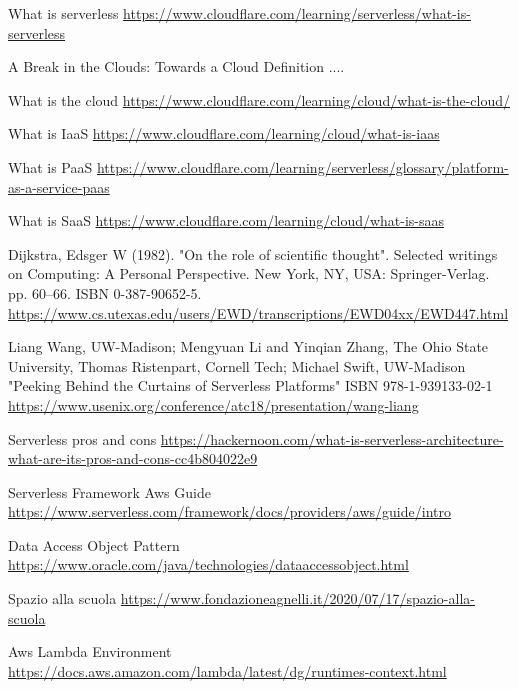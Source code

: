 \begin{thebibliography}{9}

     What is serverless
    \url{https://www.cloudflare.com/learning/serverless/what-is-serverless}

     A Break in the Clouds: Towards a Cloud
    Deﬁnition ....

     What is the cloud
    \url{https://www.cloudflare.com/learning/cloud/what-is-the-cloud/}

     What is IaaS
    \url{https://www.cloudflare.com/learning/cloud/what-is-iaas}

     What is PaaS
    \url{https://www.cloudflare.com/learning/serverless/glossary/platform-as-a-service-paas}

     What is SaaS
    \url{https://www.cloudflare.com/learning/cloud/what-is-saas}

      Dijkstra, Edsger W (1982).
    "On the role of scientific thought". Selected writings on Computing: A Personal
    Perspective. New York, NY, USA: Springer-Verlag. pp. 60–66. ISBN 0-387-90652-5.
    \url{https://www.cs.utexas.edu/users/EWD/transcriptions/EWD04xx/EWD447.html}

    Liang Wang, UW-Madison; Mengyuan Li and Yinqian Zhang, The Ohio State University,
    Thomas Ristenpart, Cornell Tech; Michael Swift, UW-Madison
    "Peeking Behind the Curtains of Serverless Platforms"
    ISBN 978-1-939133-02-1
    \url{https://www.usenix.org/conference/atc18/presentation/wang-liang}


     Serverless pros and cons
    \url{https://hackernoon.com/what-is-serverless-architecture-what-are-its-pros-and-cons-cc4b804022e9}

     Serverless Framework Aws Guide
    \url{https://www.serverless.com/framework/docs/providers/aws/guide/intro}

     Data Access Object Pattern
    \url{https://www.oracle.com/java/technologies/dataaccessobject.html}

     Spazio alla scuola
    \url{https://www.fondazioneagnelli.it/2020/07/17/spazio-alla-scuola}

     Aws Lambda Environment
    \url{https://docs.aws.amazon.com/lambda/latest/dg/runtimes-context.html}

\end{thebibliography}
